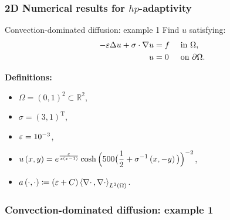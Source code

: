 \begin{frame}
  \frametitle{2D Numerical results for $hp$-adaptivity}
  
  \begin{block}{Convection-dominated diffusion: example 1}
     Find \(u\) satisfying:
    \begin{alignat}{2}
    -\eps \Delta u + \sigma \cdot \grad u & = f &  & \text{ in } \Omega, \label{eq:convection} \\
    u                                     & =0  &  & \text{ on } {\partial \Omega}. %
  \end{alignat}
  \end{block}

    \textbf{Definitions:}
    \begin{itemize}
      \item \(\Omega=\left(0,1\right)^{2} \subset \mathbb{R}^{2}\),
      \item \(\sigma=\left(3,1\right)^{\text{T}}\), 
      \item \(\varepsilon= 10^{-3}\),
      \item \(u\left(x,y\right) = \displaystyle{e^{\frac{\varepsilon}{x \left(x - 1\right)} } \cosh \Big(500 \big(\frac{1}{2} + \sigma^{-1} \left(x, -y\right)\big) \Big)^{-2}}\),
      \item \(a\left(\cdot ,\cdot\right) \coloneqq \left(\varepsilon + C\right) \left<\nabla \cdot\,,\nabla \cdot\right>_{L^{2}\left(\Omega\right)}\).
    \end{itemize}

\end{frame}

\begin{frame}
  \frametitle{Convection-dominated diffusion: example 1}
  \begin{figure}
\end{figure}
\end{frame}